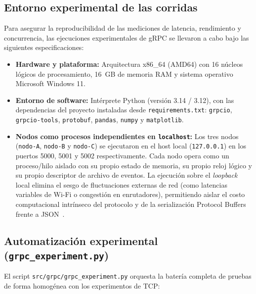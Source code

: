 \subsection{Entorno experimental de las corridas}

Para asegurar la reproducibilidad de las mediciones de latencia, rendimiento y
concurrencia, las ejecuciones experimentales de gRPC se llevaron a cabo bajo las
siguientes especificaciones:

\begin{itemize}
  \item \textbf{Hardware y plataforma:} Arquitectura x86\_64 (AMD64) con 16 núcleos
        lógicos de procesamiento, 16~GB de memoria RAM y sistema operativo
        Microsoft Windows 11.
  \item \textbf{Entorno de software:} Intérprete Python (versión 3.14 / 3.12),
        con las dependencias del proyecto instaladas desde \texttt{requirements.txt}:
        \texttt{grpcio}, \texttt{grpcio-tools}, \texttt{protobuf}, \texttt{pandas},
        \texttt{numpy} y \texttt{matplotlib}.
  \item \textbf{Nodos como procesos independientes en \texttt{localhost}:} Los tres
        nodos (\texttt{nodo-A}, \texttt{nodo-B} y \texttt{nodo-C}) se ejecutaron en
        el host local (\texttt{127.0.0.1}) en los puertos 5000, 5001 y 5002
        respectivamente. Cada nodo opera como un proceso/hilo aislado con su propio
        estado de memoria, su propio reloj lógico y su propio descriptor de archivo de
        eventos. La ejecución sobre el \emph{loopback} local elimina el sesgo de
        fluctuaciones externas de red (como latencias variables de Wi-Fi o congestión en
        enrutadores), permitiendo aislar el costo computacional intrínseco del protocolo
        y de la serialización Protocol Buffers frente a JSON~\cite{maltsev2024}.
\end{itemize}

\subsection{Automatización experimental (\texttt{grpc\_experiment.py})}

El script \texttt{src/grpc/grpc\_experiment.py} orquesta la batería completa de
pruebas de forma homogénea con los experimentos de TCP:

